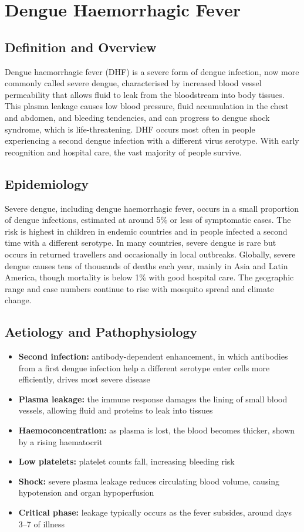 \chapter{Dengue Haemorrhagic Fever}

\section*{Definition and Overview}
Dengue haemorrhagic fever (DHF) is a severe form of dengue infection, now more commonly called severe dengue, characterised by increased blood vessel permeability that allows fluid to leak from the bloodstream into body tissues. This plasma leakage causes low blood pressure, fluid accumulation in the chest and abdomen, and bleeding tendencies, and can progress to dengue shock syndrome, which is life-threatening. DHF occurs most often in people experiencing a second dengue infection with a different virus serotype. With early recognition and hospital care, the vast majority of people survive.

\section*{Epidemiology}
Severe dengue, including dengue haemorrhagic fever, occurs in a small proportion of dengue infections, estimated at around 5\% or less of symptomatic cases. The risk is highest in children in endemic countries and in people infected a second time with a different serotype. In many countries, severe dengue is rare but occurs in returned travellers and occasionally in local outbreaks. Globally, severe dengue causes tens of thousands of deaths each year, mainly in Asia and Latin America, though mortality is below 1\% with good hospital care. The geographic range and case numbers continue to rise with mosquito spread and climate change.

\section*{Aetiology and Pathophysiology}
\begin{itemize}
    \item \textbf{Second infection:} antibody-dependent enhancement, in which antibodies from a first dengue infection help a different serotype enter cells more efficiently, drives most severe disease
    \item \textbf{Plasma leakage:} the immune response damages the lining of small blood vessels, allowing fluid and proteins to leak into tissues
    \item \textbf{Haemoconcentration:} as plasma is lost, the blood becomes thicker, shown by a rising haematocrit
    \item \textbf{Low platelets:} platelet counts fall, increasing bleeding risk
    \item \textbf{Shock:} severe plasma leakage reduces circulating blood volume, causing hypotension and organ hypoperfusion
    \item \textbf{Critical phase:} leakage typically occurs as the fever subsides, around days 3--7 of illness
\end{itemize}

